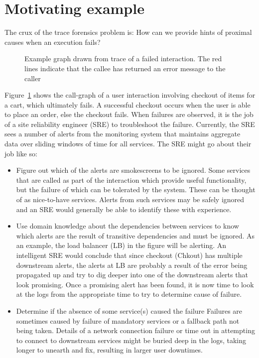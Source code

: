\section{Motivating example}
The crux of the trace forensics problem is: How can we provide hints of proximal causes when an execution fails?

\begin{figure}[h]
\caption{Example graph drawn from trace of a failed interaction. The red lines indicate that the callee has returned an error message to the caller}
\label{Failed_ex}
\end{figure}

Figure~\ref{Failed_ex} shows the  call-graph of a user interaction involving checkout of items for a cart, which ultimately fails. A successful checkout occurs when the user is able to place an order, else the checkout fails. When failures are observed, it is the job of a site reliability engineer (SRE) to troubleshoot the failure. Currently, the SRE sees a number of alerts from the monitoring system that maintains aggregate data over sliding windows of time for all services. The SRE might go about their job like so:
\begin{itemize}
\item Figure out which of the alerts are smokescreens to be ignored. \newline
Some services that are called as part of the interaction which provide useful functionality, but the failure of which can be tolerated by the system. These can be thought of as nice-to-have services. Alerts from such services may be safely ignored and an SRE would generally be able to identify these with experience.
\item Use domain knowledge about the dependencies between services to know which alerts are the result of transitive dependencies and must be ignored. \newline
As an example, the load balancer (LB) in the figure will be alerting. An intelligent SRE would conclude that since checkout (Chkout) has multiple downstream alerts, the alerts at LB are probably a result of the error being propagated up and try to dig deeper into one of the downstream alerts that look promising. Once a promising alert has been found, it is now time to look at the logs from the appropriate time to try to determine cause of failure.
\item Determine if the absence of some service(s) caused the failure \newline
Failures are sometimes caused by failure of mandatory services or a fallback path not being taken. Details of a network connection failure or time out in attempting to connect to downstream services might be buried deep in the logs, taking longer to unearth and fix, resulting in larger user downtimes. 
\end{itemize}


